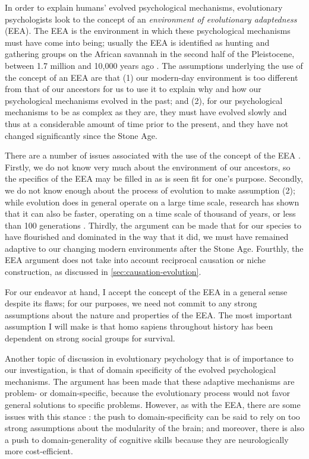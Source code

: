 In order to explain humans' evolved psychological mechanisms, evolutionary psychologists look to the concept of an \emph{environment of evolutionary adaptedness} (EEA). The EEA is the environment in which these psychological mechanisms must have come into being; usually the EEA is identified as hunting and gathering groups on the African savannah in the second half of the Pleistocene, between 1.7 million and 10,000 years ago \citep{LB02}.
The assumptions underlying the use of the concept of an EEA are that (1) our modern-day environment is too different from that of our ancestors for us to use it to explain why and how our psychological mechanisms evolved in the past; and (2), for our psychological mechanisms to be as complex as they are, they must have evolved slowly and thus at a considerable amount of time prior to the present, and they have not changed significantly since the Stone Age.

There are a number of issues associated with the use of the concept of the EEA \citep{LB02}. Firstly, we do not know very much about the environment of our ancestors, so the specifics of the EEA may be filled in as is seen fit for one's purpose. Secondly, we do not know enough about the process of evolution to make assumption (2); while evolution does in general operate on a large time scale, research has shown that it can also be faster, operating on a time scale of thousand of years, or less than 100 generations \citep[pp.~190--191 and references therein]{LB02}. Thirdly, the argument can be made that for our species to have flourished and dominated in the way that it did, we must have remained adaptive to our changing modern environments after the Stone Age. Fourthly, the EEA argument does not take into account reciprocal causation or niche construction, as discussed in \cref{sec:causation-evolution}.

For our endeavor at hand, I accept the concept of the EEA in a general sense despite its flaws; for our purposes, we need not commit to any strong assumptions about the nature and properties of the EEA. The most important assumption I will make is that homo sapiens throughout history has been dependent on strong social groups for survival.

Another topic of discussion in evolutionary psychology that is of importance to our investigation, is that of domain specificity of the evolved psychological mechanisms. The argument has been made \citep[p.~50]{Buss15} that these adaptive mechanisms are problem- or domain-specific, because the evolutionary process would not favor general solutions to specific problems.
However, as with the EEA, there are some issues with this stance \citep{LB02}: the push to domain-specificity can be said to rely on too strong assumptions about the modularity of the brain; and moreover, there is also a push to domain-generality of cognitive skills because they are neurologically more cost-efficient.

